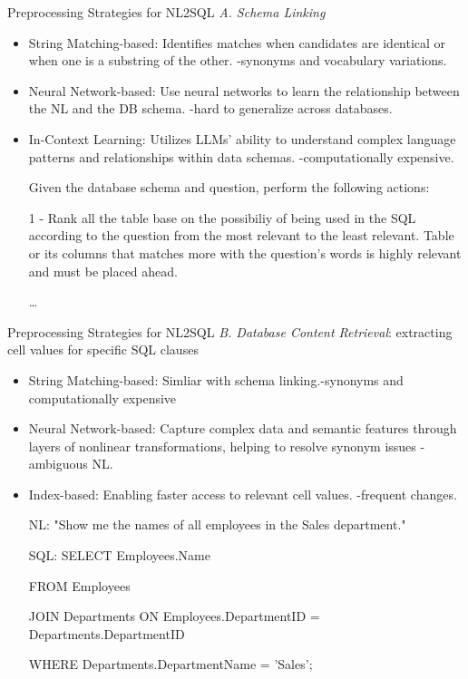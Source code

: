 \documentclass[aspectratio=169,xcolor=dvipsnames]{beamer}
\begin{document}
\begin{frame}{Preprocessing Strategies for NL2SQL}
    \textit{A. Schema Linking}
    \begin{itemize}
        \item String Matching-based: Identifies matches when candidates are identical or when one is a substring of the other. -\alert{synonyms and vocabulary variations}.
        \item Neural Network-based: Use neural networks to learn the relationship between the NL and the DB schema. -\alert{hard to generalize across databases}.
        \item In-Context Learning: Utilizes LLMs’ ability to understand complex language patterns and relationships within data schemas. -\alert{computationally expensive}.
        \begin{example}
            Given the database schema and question, perform the following actions:

            1 - Rank all the table base on the possibiliy of being used in the SQL according to the question from the most relevant to the least relevant. Table or its columns that matches more with the question's words is highly relevant and must be placed ahead.

            \dots
        \end{example}
    \end{itemize}
\end{frame}

\begin{frame}{Preprocessing Strategies for NL2SQL}
    \textit{B. Database Content Retrieval}: extracting cell values for specific SQL clauses
    \begin{itemize}
        \item String Matching-based: Simliar with schema linking.-\alert{synonyms and computationally expensive}
        \item Neural Network-based: Capture complex data and semantic features through layers of nonlinear transformations, helping to resolve synonym issues -\alert{ambiguous NL}.
        \item Index-based: Enabling faster access to relevant cell values. -\alert{frequent changes}.
        \begin{example}
            NL: "Show me the names of all employees in the \alert{Sales} department."

            SQL: SELECT Employees.Name  

            FROM Employees  

            JOIN Departments ON Employees.DepartmentID = Departments.DepartmentID  

            WHERE Departments.DepartmentName = '\alert{Sales}';
        \end{example}
    \end{itemize}
\end{frame}
\end{document}
